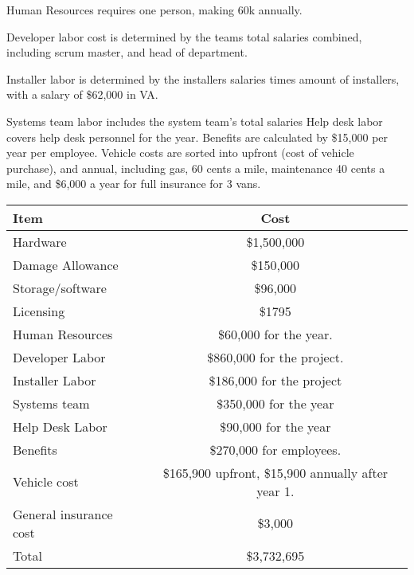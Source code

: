 \documentclass{report}
\begin{document}
Human Resources requires one person, making 60k annually. 

Developer labor cost is determined by the teams total salaries combined, including scrum master, and head of department.

Installer labor is determined by the installers salaries times amount of installers, with a salary of \$62,000 in VA.

Systems team labor includes the system team's total salaries
Help desk labor covers help desk personnel for the year. 
Benefits are calculated by \$15,000 per year per employee.
Vehicle costs are sorted into upfront (cost of vehicle purchase), and annual, 
including gas, 60 cents a mile, maintenance 40 cents a mile, 
and \$6,000 a year for full insurance for 3 vans.

\begin{tabular}{|l|c|}
\hline
Item & Cost \\
\hline
Hardware & \$1,500,000 \\
\hline
Damage Allowance & \$150,000 \\
\hline
Storage/software & \$96,000 \\
\hline
Licensing & \$1795 \\
\hline
Human Resources & \$60,000 for the year. \\
\hline
Developer Labor & \$860,000 for the project. \\
\hline
Installer Labor & \$186,000 for the project \\
\hline
Systems team & \$350,000 for the year \\
\hline
Help Desk Labor & \$90,000 for the year \\
\hline
Benefits & \$270,000 for employees. \\
\hline
Vehicle cost & \$165,900 upfront, \$15,900 annually after year 1. \\
\hline
General insurance cost & \$3,000 \\
\hline
Total & \$3,732,695 \\

\hline
\end{tabular}
\end{document}
